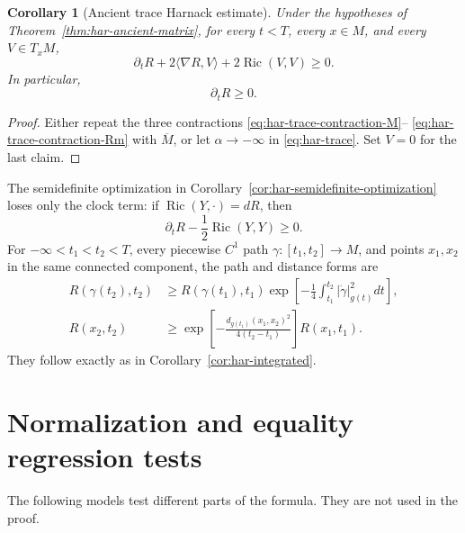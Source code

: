 \documentclass[10pt]{coll-l}
\newtheorem{corollary}[theorem]{Corollary}
\theoremstyle{definition}
\theoremstyle{remark}
\numberwithin{section}{chapter}
\numberwithin{equation}{chapter}
\newcommand{\Ric}{\operatorname{Ric}}
\begin{document}
\begin{corollary}[Ancient trace Harnack estimate]
\label{cor:har-ancient-trace}
Under the hypotheses of Theorem~\ref{thm:har-ancient-matrix}, for every
$t<T$, every $x\in M$, and every $V\in T_xM$,
\begin{equation}
 \boxed{
 \partial_tR+2\langle\nabla R,V\rangle+2\Ric(V,V)\geq0.}              \label{eq:har-ancient-trace}
\end{equation}
In particular,
\begin{equation}
                              \partial_tR\geq0.          \label{eq:har-ancient-R-monotone}
\end{equation}
\end{corollary}

\begin{proof}
Either repeat the three contractions
\eqref{eq:har-trace-contraction-M}--
\eqref{eq:har-trace-contraction-Rm} with $\overline M$, or let
$\alpha\to-\infty$ in \eqref{eq:har-trace}.  Set $V=0$ for the last claim.
\end{proof}

The semidefinite optimization in
Corollary~\ref{cor:har-semidefinite-optimization} loses only the clock term:
if $\Ric(Y,\cdot)=dR$, then
\begin{equation}
                       \partial_tR-\frac12\Ric(Y,Y)\geq0.             \label{eq:har-ancient-optimized}
\end{equation}
For $-\infty<t_1<t_2<T$, every piecewise $C^1$ path
$\gamma:[t_1,t_2]\to M$, and points $x_1,x_2$ in the same connected
component, the path and distance forms are
\begin{align}
 R(\gamma(t_2),t_2)
 &\geq R(\gamma(t_1),t_1)
  \exp\!\left[-\frac14\int_{t_1}^{t_2}|\dot\gamma|_{g(t)}^2dt\right], \label{eq:har-ancient-path}\\
 R(x_2,t_2)
 &\geq\exp\!\left[-\frac{d_{g(t_1)}(x_1,x_2)^2}
                    {4(t_2-t_1)}\right]R(x_1,t_1).      \label{eq:har-ancient-distance}
\end{align}
They follow exactly as in Corollary~\ref{cor:har-integrated}.

\section{Normalization and equality regression tests}
\label{sec:har-regression}

The following models test different parts of the formula.  They are not
used in the proof.
\end{document}
